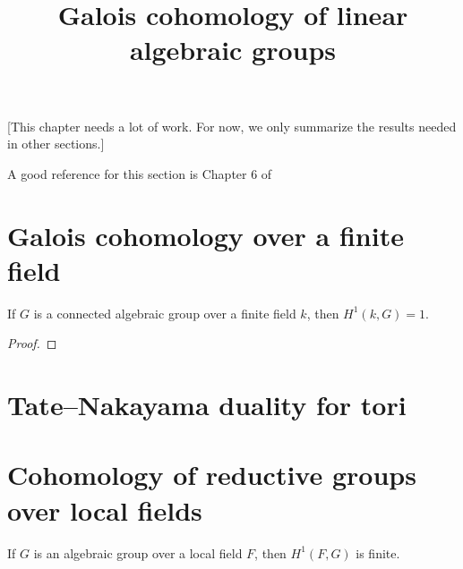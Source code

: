 


%


\title{Galois cohomology of linear algebraic groups}


\maketitle

\label{section-phantom}

\tableofcontents

[This chapter needs a lot of work. For now, we only summarize the results needed in other sections.]

A good reference for this section is Chapter 6 of \cite{Platonov-Rapinchuk}

\section{Galois cohomology over a finite field}
\label{section-finite-field}

\begin{theorem}
 \label{theorem-Lang}
If $G$ is a connected algebraic group over a finite field $k$, then $H^1(k, G)=1$. 
\end{theorem}

\begin{proof}
 
\end{proof}


\section{Tate--Nakayama duality for tori}
 \label{section-Tate-Nakayama}
 

\section{Cohomology of reductive groups over local fields}
\label{section-local-fields}

\begin{lemma}
 \label{lemma-cohomology-finite}
If $G$ is an algebraic group over a local field $F$, then $H^1(F, G)$ is finite.
\end{lemma}

